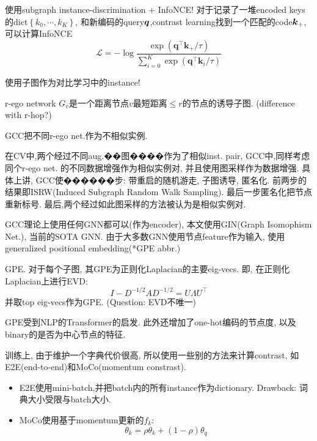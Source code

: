 \documentclass{article}
\begin{document}
\begin{flushleft}

 使用subgraph instance-discrimination + InfoNCE! 对于记录了一堆encoded keys的dict$\left\{k_{0}, \cdots, k_{K}\right\}$, 和新编码的query$\boldsymbol{q}$,contrast learning找到一个匹配的code$\boldsymbol{k}_+$,可以计算InfoNCE
\begin{equation}
    \mathcal{L}=-\log \frac{\exp \left(\boldsymbol{q}^{\top} \boldsymbol{k}_{+} / \tau\right)}{\sum_{i=0}^{K} \exp \left(\boldsymbol{q}^{\top} \boldsymbol{k}_{i} / \tau\right)}
\end{equation}

使用子图作为对比学习中的instance!
\begin{definition}
    r-ego network $G_v$是一个距离节点$v$最短距离$\le r$的节点的诱导子图. (difference with r-hop?)
\end{definition}
GCC把不同r-ego net.作为不相似实例.

在CV中,两个经过不同aug.��图����作为了相似inst. pair, GCC中,同样考虑同个r-ego net. 的不同数据增强作为相似实例对, 并且使用图采样作为数据增强. 具体上讲, GCC使������步: 带重启的随机游走, 子图诱导, 匿名化. 前两步的结果即ISRW(Induced Subgraph Random Walk Sampling). 最后一步匿名化把节点重新标号. 最后,两个经过如此图采样的方法被认为是相似实例对.

GCC理论上使用任何GNN都可以(作为encoder), 本文使用GIN(Graph Isomophism Net.), 当前的SOTA GNN. 由于大多数GNN使用节点feature作为输入, 使用generalized positional embedding(*GPE abbr.)

\begin{definition}
    GPE. 对于每个子图, 其GPE为正则化Laplacian的主要eig-vecs. 即, 在正则化Laplacian上进行EVD:
    \begin{equation}
        I-D^{-1 / 2} A D^{-1 / 2}=U \Lambda U^{\top}
    \end{equation}
    并取top eig-vecs作为GPE.
    (Question: EVD不唯一)
\end{definition}

GPE受到NLP的Transformer的启发. 此外还增加了one-hot编码的节点度, 以及binary的是否为中心节点的特征.

训练上, 由于维护一个字典代价很高, 所以使用一些别的方法来计算contrast, 如E2E(end-to-end)和MoCo(momentum constrast). \begin{itemize}
    \item E2E使用mini-batch,并把batch内的所有instance作为dictionary. Drawback: 词典大小受限与batch大小.
    \item MoCo使用基于momentum更新的$f_k$: 
    $$
    \theta_k = \rho \theta_k + (1-\rho)\theta_q
    $$
\end{itemize}

\end{flushleft}
\end{document}

